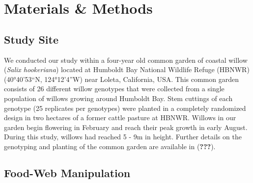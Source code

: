 \documentclass[]{elsarticle} %
\begin{document}
\section{Materials \& Methods}\label{materials-methods}

\subsection{Study Site}\label{study-site}

We conducted our study within a four-year old common garden of coastal
willow (\emph{Salix hookeriana}) located at Humboldt Bay National
Wildlife Refuge (HBNWR) (40°40'53``N, 124°12'4''W) near Loleta,
California, USA. This common garden consists of 26 different willow
genotypes that were collected from a single population of willows
growing around Humboldt Bay. Stem cuttings of each genotype (25
replicates per genotypes) were planted in a completely randomized design
in two hectares of a former cattle pasture at HBNWR. Willows in our
garden begin flowering in February and reach their peak growth in early
August. During this study, willows had reached 5 - 9m in height. Further
details on the genotyping and planting of the common garden are
available in ({\textbf{???}}).

\subsection{Food-Web Manipulation}\label{food-web-manipulation}
\end{document}

